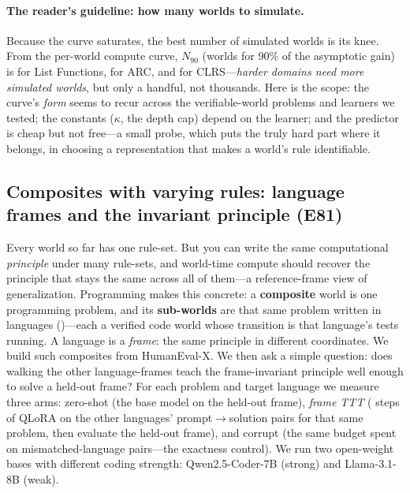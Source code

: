 \documentclass[11pt]{article}
\begin{document}
\paragraph{The reader's guideline: how many worlds to simulate.} Because the curve saturates,
the best number of simulated worlds is its knee. From the per-world compute curve, $N_{90}$
(worlds for 90\% of the asymptotic gain) is \WCListfn{} for List Functions, \WCArc{} for ARC, and
\WCClrs{} for CLRS---\emph{harder domains need more simulated worlds}, but only a handful, not
thousands. Here is the scope: the curve's \emph{form} seems to recur across the verifiable-world problems
and learners we tested; the constants ($\kappa$, the depth cap) depend on the learner; and the predictor is
cheap but not free---a small probe, which puts the truly hard part where it belongs, in
choosing a representation that makes a world's rule identifiable.

\subsection{Composites with varying rules: language frames and the invariant principle (E81)}\label{sec:frame-invariance}
Every world so far has one rule-set. But you can write the same computational \emph{principle}
under many rule-sets, and world-time compute should recover the principle that stays the same across
all of them---a reference-frame view of generalization. Programming makes this concrete: a
\textbf{composite} world is one programming problem, and its \textbf{sub-worlds} are that same problem
written in \FrameNLangs{} languages (\FrameLangs)---each a verified code world whose transition is
that language's tests running. A language is a \emph{frame}: the same principle in different
coordinates. We build \FrameNWorlds{} such composites from HumanEval-X. We then ask a simple
question: does walking the other language-frames teach the frame-invariant principle well enough to
solve a held-out frame? For each problem and target language we measure three arms: zero-shot
(the base model on the held-out frame), \emph{frame TTT} (\FrameTttSteps{} steps of QLoRA on the
other languages' prompt$\to$solution pairs for that same problem, then evaluate the held-out
frame), and corrupt (the same budget spent on mismatched-language pairs---the exactness
control). We run two open-weight bases with different coding strength: Qwen2.5-Coder-7B (strong) and
Llama-3.1-8B (weak).
\end{document}
